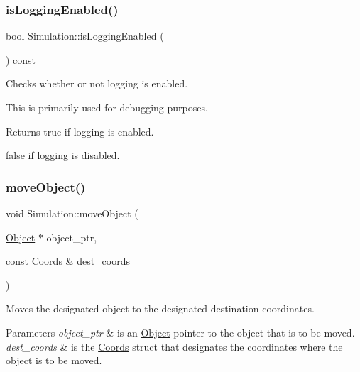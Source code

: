 \subsubsection{\texorpdfstring{is\+Logging\+Enabled()}{isLoggingEnabled()}}
{\footnotesize\ttfamily bool Simulation\+::is\+Logging\+Enabled (\begin{DoxyParamCaption}{ }\end{DoxyParamCaption}) const}



Checks whether or not logging is enabled. 

This is primarily used for debugging purposes. \begin{DoxyReturn}{Returns}
true if logging is enabled. 

false if logging is disabled. 
\end{DoxyReturn}
\mbox{\label{class_simulation_a7b10f51640088366d0d1278361817e8d}} 
\subsubsection{\texorpdfstring{move\+Object()}{moveObject()}}
{\footnotesize\ttfamily void Simulation\+::move\+Object (\begin{DoxyParamCaption}\item[{\hyperlink{class_object}{Object} $\ast$}]{object\+\_\+ptr,  }\item[{const \hyperlink{struct_coords}{Coords} \&}]{dest\+\_\+coords }\end{DoxyParamCaption})\hspace{0.3cm}{\ttfamily [protected]}}



Moves the designated object to the designated destination coordinates. 


\begin{DoxyParams}{Parameters}
{\em object\+\_\+ptr} & is an \hyperlink{class_object}{Object} pointer to the object that is to be moved. \\
\hline
{\em dest\+\_\+coords} & is the \hyperlink{struct_coords}{Coords} struct that designates the coordinates where the object is to be moved. \\
\hline
\end{DoxyParams}
\mbox{\label{class_simulation_a3a4808231d4760f0ab30ea39b6a67e8c}} 
